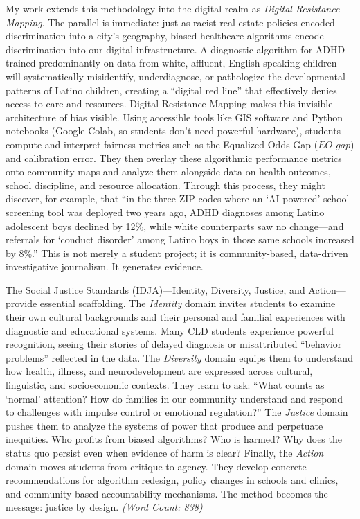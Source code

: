 \documentclass[11pt,twoside]{article}
\DeclareRobustCommand{\EOgap}{EO\text{-}gap\xspace}
\begin{document}
My work extends this methodology into the digital realm as \textit{Digital Resistance Mapping}. The parallel is immediate: just as racist real-estate policies encoded discrimination into a city’s geography, biased healthcare algorithms encode discrimination into our digital infrastructure. A diagnostic algorithm for ADHD trained predominantly on data from white, affluent, English-speaking children will systematically misidentify, underdiagnose, or pathologize the developmental patterns of Latino children, creating a “digital red line” that effectively denies access to care and resources. Digital Resistance Mapping makes this invisible architecture of bias visible. Using accessible tools like GIS software and Python notebooks (Google Colab, so students don’t need powerful hardware), students compute and interpret fairness metrics such as the Equalized-Odds Gap ($\EOgap$) and calibration error. They then overlay these algorithmic performance metrics onto community maps and analyze them alongside data on health outcomes, school discipline, and resource allocation. Through this process, they might discover, for example, that “in the three ZIP codes where an ‘AI-powered’ school screening tool was deployed two years ago, ADHD diagnoses among Latino adolescent boys declined by 12\%, while white counterparts saw no change—and referrals for ‘conduct disorder’ among Latino boys in those same schools increased by 8\%.” This is not merely a student project; it is community-based, data-driven investigative journalism. It generates evidence.

The Social Justice Standards (IDJA)—Identity, Diversity, Justice, and Action—provide essential scaffolding. The \textit{Identity} domain invites students to examine their own cultural backgrounds and their personal and familial experiences with diagnostic and educational systems. Many CLD students experience powerful recognition, seeing their stories of delayed diagnosis or misattributed “behavior problems” reflected in the data. The \textit{Diversity} domain equips them to understand how health, illness, and neurodevelopment are expressed across cultural, linguistic, and socioeconomic contexts. They learn to ask: “What counts as ‘normal’ attention? How do families in our community understand and respond to challenges with impulse control or emotional regulation?” The \textit{Justice} domain pushes them to analyze the systems of power that produce and perpetuate inequities. Who profits from biased algorithms? Who is harmed? Why does the status quo persist even when evidence of harm is clear? Finally, the \textit{Action} domain moves students from critique to agency. They develop concrete recommendations for algorithm redesign, policy changes in schools and clinics, and community-based accountability mechanisms. The method becomes the message: justice by design. \textit{(Word Count: 838)}
\end{document}
